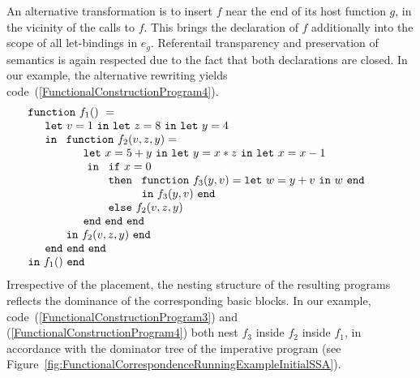 An alternative transformation is to insert $f$ near the end of its
host function $g$, in the vicinity of the calls to $f$. This brings
the declaration of $f$ additionally into the scope of all let-bindings
in $e_g$. Referentail transparency and preservation of semantics is
again respected due to the fact that both declarations are closed.  In
our example, the alternative rewriting yields
code~(\ref{FunctionalConstructionProgram4}).
\begin{equation}
\label{FunctionalConstructionProgram4}
\begin{array}{l}
\mathtt{function}\ f_1()\ = \\
  \quad
  \begin{array}{l}
     \mathtt{let}\ v = 1 \ 
     \mathtt{in\ let}\ z = 8 \ 
     \mathtt{in\ let}\ y = 4\\
     \mathtt{in}\ 
     \begin{array}[t]{l}
       \mathtt{function}\ f_2(v,z,y) =\\
         \quad
         \begin{array}{l}
           \mathtt{let}\ x = 5+y\
           \mathtt{in\ let}\ y = x*z\
           \mathtt{in\ let}\ x = x-1\\\
           \mathtt{in}\
           \begin{array}[t]{l}
             \mathtt{if}\ x=0\\ 
             \mathtt{then}\ 
               \begin{array}[t]{l}
                 \mathtt{function}\ f_3(y,v) = 
                 \mathtt{let}\ w = y+v\ \mathtt{in}\ w\ \mathtt{end}\\
                 \mathtt{in}\ f_3(y,v)\ \mathtt{end}
               \end{array}\\
             \mathtt{else}\ f_2(v,z,y)
           \end{array}\\
           \mathtt{end\ end\ end}
         \end{array}\\
     \mathtt{in}\ f_2(v,z,y)\ \mathtt{end}
     \end{array}\\
     \mathtt{end\ end\ end}\\
   \end{array}\\
\mathtt{in}\ f_1()\  \mathtt{end}
\end{array}
\end{equation}
Irrespective of the placement, the nesting structure of the resulting
programs reflects the dominance of the corresponding basic blocks. In
our example, code~(\ref{FunctionalConstructionProgram3}) and
(\ref{FunctionalConstructionProgram4}) both nest $f_3$ inside $f_2$
inside $f_1$, in accordance with the dominator tree of the imperative
program (see
Figure~\ref{fig:FunctionalCorrespondenceRunningExampleInitialSSA}).

